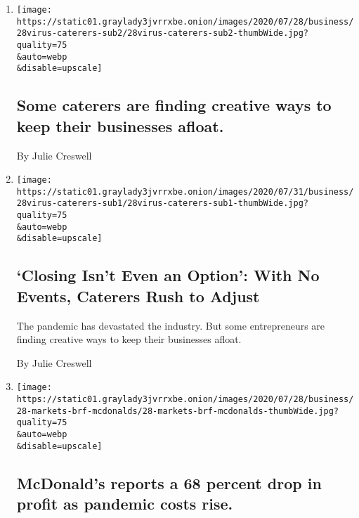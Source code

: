 \begin{enumerate}
\def\labelenumi{\arabic{enumi}.}
\item
  \href{/2020/08/04/business/some-caterers-are-finding-creative-ways-to-keep-their-businesses-afloat.html}{}

  \texttt{[image: https://static01.graylady3jvrrxbe.onion/images/2020/07/28/business/28virus-caterers-sub2/28virus-caterers-sub2-thumbWide.jpg?quality=75\\\&auto=webp\\\&disable=upscale]}

  \hypertarget{some-caterers-are-finding-creative-ways-to-keep-their-businesses-afloat}{%
  \subsection{Some caterers are finding creative ways to keep their
  businesses
  afloat.}\label{some-caterers-are-finding-creative-ways-to-keep-their-businesses-afloat}}

  By Julie Creswell
\item
  \href{/2020/08/04/business/coronavirus-struggling-caterers.html}{}

  \texttt{[image: https://static01.graylady3jvrrxbe.onion/images/2020/07/31/business/28virus-caterers-sub1/28virus-caterers-sub1-thumbWide.jpg?quality=75\\\&auto=webp\\\&disable=upscale]}

  \hypertarget{closing-isnt-even-an-option-with-no-events-caterers-rush-to-adjust}{%
  \subsection{`Closing Isn't Even an Option': With No Events, Caterers
  Rush to
  Adjust}\label{closing-isnt-even-an-option-with-no-events-caterers-rush-to-adjust}}

  The pandemic has devastated the industry. But some entrepreneurs are
  finding creative ways to keep their businesses afloat.

  By Julie Creswell
\item
  \href{/live/2020/07/28/business/stock-market-today-coronavirus/mcdonalds-reports-a-68-percent-drop-in-profit-as-pandemic-costs-rise}{}

  \texttt{[image: https://static01.graylady3jvrrxbe.onion/images/2020/07/28/business/28-markets-brf-mcdonalds/28-markets-brf-mcdonalds-thumbWide.jpg?quality=75\\\&auto=webp\\\&disable=upscale]}

  \hypertarget{mcdonalds-reports-a-68-percent-drop-in-profit-as-pandemic-costs-rise}{%
  \subsection{McDonald's reports a 68 percent drop in profit as pandemic
  costs
  rise.}\label{mcdonalds-reports-a-68-percent-drop-in-profit-as-pandemic-costs-rise}}


\end{enumerate}
